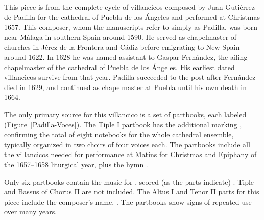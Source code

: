 
\begin{notesources}

    \begin{source}
    \end{source}

    \begin{source}
    \end{source}

\end{notesources}

This piece is from the complete cycle of villancicos composed by Juan Gutiérrez 
de Padilla for the cathedral of Puebla de los Ángeles and performed at 
Christmas 1657.%
    \Autocite[133--226]{Cashner:PhD}
This composer, whom the manuscripts refer to simply as Padilla, was born near
Málaga in southern Spain around 1590.%
    \Autocites{Mauleon:PadillaPalafox}{Hurtado:Padilla}{Stevenson:Padilla}
He served as chapelmaster of churches in Jérez de la Frontera and Cádiz before
emigrating to New Spain around 1622.
In 1628 he was named assistant to Gaspar Fernández, the ailing chapelmaster of
the cathedral of Puebla de los Ángeles.
His earliest dated villancicos survive from that year.%
    \Autocite{Cashner:Cards}
Padilla succeeded to the post after Fernández died in 1629, and continued as
chapelmaster at Puebla until his own death in 1664.

The only primary source for this villancico is a set of partbooks, each labeled
 (Figure~\ref{Padilla-Voces}).
  \Autocites{Puebla:Microfilm}{Stanford:Catalog}
The Tiple I partbook has the additional marking , 
confirming the total of eight notebooks for the whole cathedral ensemble, 
typically organized in two choirs of four voices each.
The partbooks include all the villancicos needed for performance at Matins for 
Christmas and Epiphany of the 1657--1658 liturgical year, plus the hymn 
.

Only six partbooks contain the music for , 
scored (as the parts indicate) .
Tiple and Bassus of Chorus II are not included.
The Altus I and Tenor II parts for this piece include the composer's name, 
.
The partbooks show signs of repeated use over many years.

